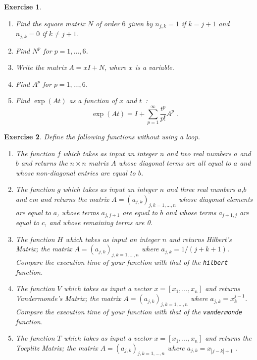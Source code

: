 \documentclass{article}
\newtheorem{exo}{Exercise}[section]
\begin{document}
\begin{exo}{\rm ~
\begin{enumerate}
\item
Find the square matrix $N$ of order $6$ given by $n_{j,k}=1$ if
$k=j+1$ and $n_{j,k}=0$ if $k \neq j+1$. 
\item
Find $N^p$ for $p=1,\ldots,6$. 
\item
Write the matrix $A = xI+N$, where $x$ is a variable.
\item
Find $A^p$ for $p=1,\ldots,6$. 
\item 
Find $\exp(At)$ as a function of $x$ and $t$~:
\[
\exp(At) = I+\sum_{p=1}^\infty \frac{t^p}{p!} A^p\;.
\]
\end{enumerate} 
}\end{exo}
\begin{exo}{\rm 
Define the following functions without using a loop.
\begin{enumerate}
\item
The function $f$ which takes as input an integer $n$ and two real
numbers $a$ and $b$ and returns the $n\times n$ matrix $A$ whose
diagonal terms are all equal to $a$ and whose non-diagonal entries are
equal to $b$.
\item
The function $g$ which takes as input an integer $n$ and three real
numbers $a$,$b$ and $c$m and returns the matrix 
$A=(a_{j,k})_{j,k=1,\ldots,n}$ whose diagonal elements are equal to
$a$, whose terms $a_{j,j+1}$ are equal to $b$  and whose terms $a_{j+1,j}$ 
are equal to $c$, and whose remaining terms are 0.
\item
The function $H$ which takes as input an integer $n$ and returns
Hilbert's Matrix; the matrix $A=(a_{j,k})_{j,k=1,\ldots,n}$ where
$a_{j,k} = 1/(j+k+1)$.
Compare the execution time of your function with that of the
\texttt{hilbert} function.
\item
The function $V$ which takes as input a vector $x=[x_1,\dots,x_n]$ and
returns Vandermonde's Matrix; the matrix
$A=(a_{j,k})_{j,k=1,\ldots,n}$ where $a_{j,k} = x_k^{j-1}$.
Compare the execution time of your function with that of the
\texttt{vandermonde} function.
\item
The function $T$ which takes as input a vector $x=[x_1,\dots,x_n]$ and
returns the Toeplitz Matrix; the matrix
$A=(a_{j,k})_{j,k=1,\ldots,n}$ where
$a_{j,k} = x_{|j-k|+1}$ .
\end{enumerate}
}\end{exo}
\end{document}

